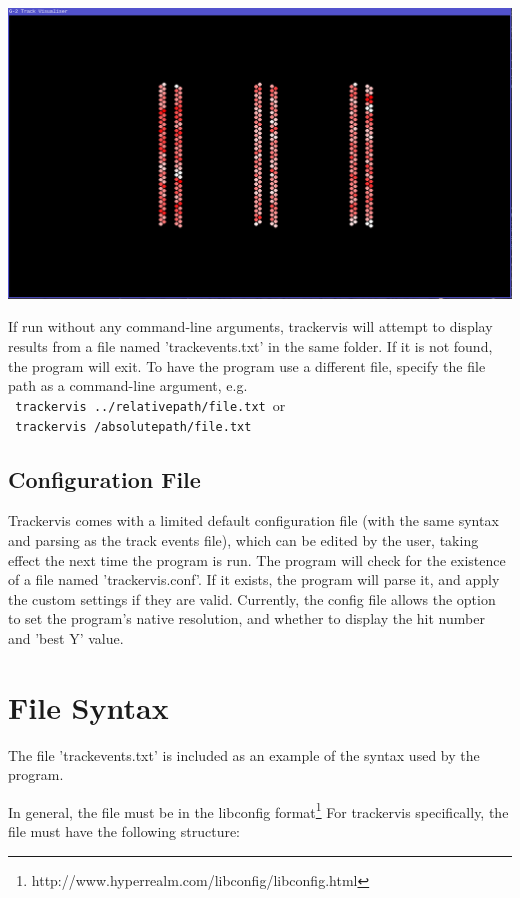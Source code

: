 \documentclass[12pt]{article}
\begin{document}
\includegraphics[width=\textwidth]{pic2}

If run without any command-line arguments, trackervis will attempt to display results from a file named 'trackevents.txt' in the same folder. If it is not found, the program will exit. To have the program use a different file, specify the file path as a command-line argument, e.g.\ \\
\verb| trackervis ../relativepath/file.txt|\ or \\
\verb| trackervis /absolutepath/file.txt|

\subsection*{Configuration File}

Trackervis comes with a limited default configuration file (with the same syntax and parsing as the track events file), which can be edited by the user, taking effect the next time the program is run. The program will check for the existence of a file named 'trackervis.conf'. If it exists, the program will parse it, and apply the custom settings if they are valid. Currently, the config file allows the option to set the program's native resolution, and whether to display the hit number and 'best Y' value.\newline

\section*{File Syntax}

The file 'trackevents.txt' is included as an example of the syntax used by the program.\newline

In general, the file must be in the libconfig format\footnote{http://www.hyperrealm.com/libconfig/libconfig.html} For trackervis specifically, the file must have the following structure:
\end{document}
